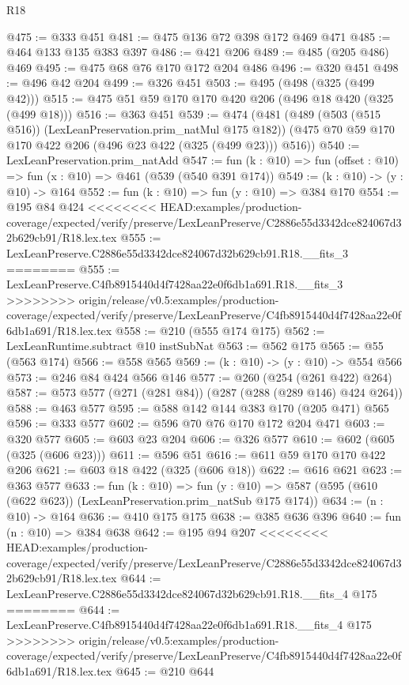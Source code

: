 \begin{lexlean}{R18}
\begin{coremodule}
{{{{{{{{{{{{{@475 := @333 @451
@481 := @475 @136 @72 @398 @172 @469 @471
@485 := @464 @133 @135 @383 @397
@486 := @421 @206
@489 := @485 (@205 @486) @469
@495 := @475 @68 @76 @170 @172 @204 @486
@496 := @320 @451
@498 := @496 @42 @204
@499 := @326 @451
@503 := @495 (@498 (@325 (@499 @42)))
@515 := @475 @51 @59 @170 @170 @420 @206 (@496 @18 @420 (@325 (@499 @18)))
@516 := @363 @451
@539 := @474
    (@481
      (@489 (@503 (@515 @516)) (LexLeanPreservation.prim_natMul @175 @182))
      (@475 @70 @59 @170 @170 @422 @206 (@496 @23 @422 (@325 (@499 @23))) @516))
@540 := LexLeanPreservation.prim_natAdd
@547 := fun (k : @10) => fun (offset : @10) => fun (x : @10) => @461 (@539 (@540 @391 @174))
@549 := (k : @10) -> (y : @10) -> @164
@552 := fun (k : @10) => fun (y : @10) => @384 @170
@554 := @195 @84 @424
<<<<<<<< HEAD:examples/production-coverage/expected/verify/preserve/LexLeanPreserve/C2886e55d3342dce824067d32b629cb91/R18.lex.tex
@555 := LexLeanPreserve.C2886e55d3342dce824067d32b629cb91.R18.__fits_3
========
@555 := LexLeanPreserve.C4fb8915440d4f7428aa22e0f6db1a691.R18.__fits_3
>>>>>>>> origin/release/v0.5:examples/production-coverage/expected/verify/preserve/LexLeanPreserve/C4fb8915440d4f7428aa22e0f6db1a691/R18.lex.tex
@558 := @210 (@555 @174 @175)
@562 := LexLeanRuntime.subtract @10 instSubNat
@563 := @562 @175
@565 := @55 (@563 @174)
@566 := @558 @565
@569 := (k : @10) -> (y : @10) -> @554 @566
@573 := @246 @84 @424 @566 @146
@577 := @260 (@254 (@261 @422) @264)
@587 := @573 @577 (@271 (@281 @84)) (@287 (@288 (@289 @146) @424 @264))
@588 := @463 @577
@595 := @588 @142 @144 @383 @170 (@205 @471) @565
@596 := @333 @577
@602 := @596 @70 @76 @170 @172 @204 @471
@603 := @320 @577
@605 := @603 @23 @204
@606 := @326 @577
@610 := @602 (@605 (@325 (@606 @23)))
@611 := @596 @51
@616 := @611 @59 @170 @170 @422 @206
@621 := @603 @18 @422 (@325 (@606 @18))
@622 := @616 @621
@623 := @363 @577
@633 := fun (k : @10) =>
  fun (y : @10) => @587 (@595 (@610 (@622 @623)) (LexLeanPreservation.prim_natSub @175 @174))
@634 := (n : @10) -> @164
@636 := @410 @175 @175
@638 := @385 @636 @396
@640 := fun (n : @10) => @384 @638
@642 := @195 @94 @207
<<<<<<<< HEAD:examples/production-coverage/expected/verify/preserve/LexLeanPreserve/C2886e55d3342dce824067d32b629cb91/R18.lex.tex
@644 := LexLeanPreserve.C2886e55d3342dce824067d32b629cb91.R18.__fits_4 @175
========
@644 := LexLeanPreserve.C4fb8915440d4f7428aa22e0f6db1a691.R18.__fits_4 @175
>>>>>>>> origin/release/v0.5:examples/production-coverage/expected/verify/preserve/LexLeanPreserve/C4fb8915440d4f7428aa22e0f6db1a691/R18.lex.tex
@645 := @210 @644
}}}}}}}}}}}}}
\end{coremodule}
\end{lexlean}
